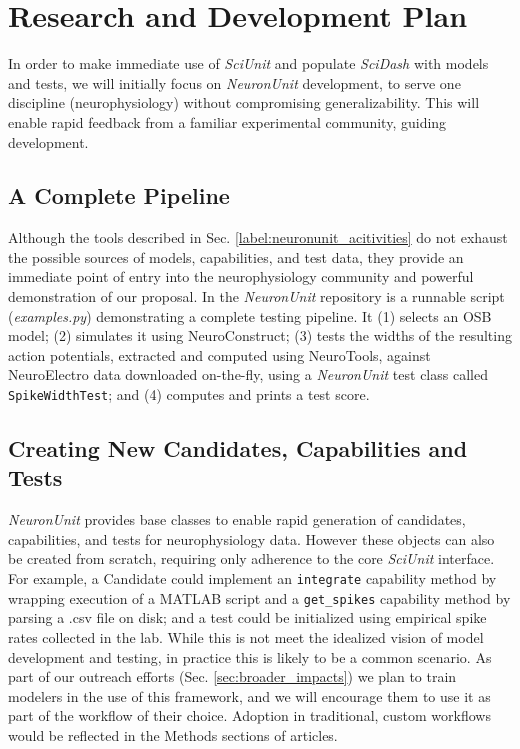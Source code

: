 \documentclass[11pt,letterpaper]{article}
\let\verbx\lstinline
\begin{document}

\section{Research and Development Plan}
In order to make immediate use of \textit{SciUnit} and populate \textit{SciDash} with models and tests, we will initially focus on \textit{NeuronUnit} development, to serve one discipline (neurophysiology) without compromising generalizability. This will enable rapid feedback from a familiar experimental community, guiding development.  

\subsection{A Complete Pipeline}
Although the tools described in Sec. \ref{label:neuronunit_acitivities} do not exhaust the possible sources of models, capabilities, and test data, they provide an immediate point of entry into the neurophysiology community and powerful demonstration of our proposal.  In the \textit{NeuronUnit} repository\cite{neurounit_url} is a runnable script (\textit{examples.py}) demonstrating a complete testing pipeline.  It (1) selects an OSB model; (2) simulates it using NeuroConstruct; (3) tests the widths of the resulting action potentials, extracted and computed using NeuroTools, against NeuroElectro data downloaded on-the-fly, using a \textit{NeuronUnit} test class called \verbx{SpikeWidthTest}; and (4) computes and prints a test score. 

\subsection{Creating New Candidates, Capabilities and Tests}
\textit{NeuronUnit} provides base classes to enable rapid generation of candidates, capabilities, and tests for neurophysiology data.  However these objects can also be created from scratch, requiring only adherence to the core \textit{SciUnit} interface.  For example, a Candidate could implement an \verbx{integrate} capability method by wrapping execution of a MATLAB script and a \verbx{get_spikes} capability method by parsing a .csv file on disk; and a test could be initialized using empirical spike rates collected in the lab.  While this is not meet the idealized vision of model development and testing, in practice this is likely to be a common scenario.  As part of our outreach efforts (Sec. \ref{sec:broader_impacts}) we plan to train modelers in the use of this framework, and we will encourage them to use it as part of the workflow of their choice.  Adoption in traditional, custom workflows would be reflected in the Methods sections of articles.  
\end{document}
